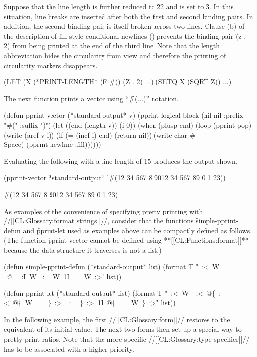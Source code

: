 Suppose that the line length is further reduced to \f{22} and  is
set to \f{3}. In this situation, line breaks are inserted after both the first
and second binding pairs.  In addition, the second binding pair is itself
broken across two lines.  Clause (b) of the description of fill-style
conditional newlines () 
prevents the binding pair \f{(z . 2)} from being printed
at the end of the third line.  Note that the length abbreviation hides the
circularity from view and therefore the printing of circularity markers
disappears.
 
\code
 (LET (X
       (*PRINT-LENGTH*
        (F #))
       (Z . 2) ...)
   (SETQ X (SQRT Z))
   ...)
\endcode
 
The next function prints a vector using ``\f{\#(...)}'' notation.
      
\code
(defun pprint-vector (*standard-output* v)
  (pprint-logical-block (nil nil :prefix "#(" :suffix ")")
    (let ((end (length v)) (i 0))
      (when (plusp end)
        (loop (pprint-pop)
              (write (aref v i))
              (if (= (incf i) end) (return nil))
              (write-char #\\Space)
              (pprint-newline :fill))))))
\endcode

Evaluating the following with a line length of 15 produces the output shown.
 
\code
 (pprint-vector *standard-output* '#(12 34 567 8 9012 34 567 89 0 1 23))
 
 #(12 34 567 8 
   9012 34 567 
   89 0 1 23)
\endcode

As examples of the convenience of specifying pretty printing with 
//[[CL:Glossary:format strings]]//, consider that the functions \f{simple-pprint-defun}
and \f{pprint-let} used as examples above can be compactly defined as follows.
(The function \f{pprint-vector} cannot be defined using **[[CL:Functions:format]]**
because the data structure it traverses is not a list.)
 
\code
(defun simple-pprint-defun (*standard-output* list)
  (format T "~:<~W ~@_~:I~W ~:_~W~1I ~_~W~:>" list))

(defun pprint-let (*standard-output* list)
  (format T "~:<~W~{\hat}~:<~@\{~:<~@\{~W~{\hat}~_~\}~:>~{\hat}~:_~\}~:>~1I~@\{~{\hat}~_~W~\}~:>" list)) 
\endcode

In the following example, the first //[[CL:Glossary:form]]// restores
 to the equivalent of its initial value.
The next two forms then set up a special way to pretty print ratios.
Note that the more specific //[[CL:Glossary:type specifier]]// has to be associated
with a higher priority.
 
